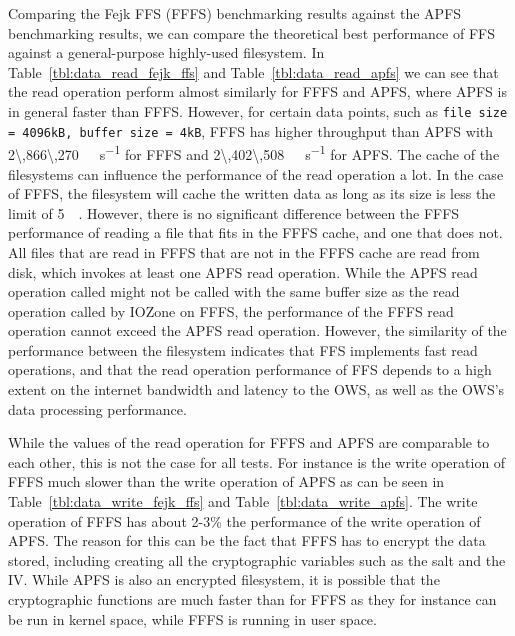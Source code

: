 Comparing the Fejk FFS (FFFS) benchmarking results against the APFS benchmarking results, we can compare the theoretical best performance of FFS against a general-purpose highly-used filesystem. In Table~\ref{tbl:data_read_fejk_ffs} and Table~\ref{tbl:data_read_apfs} we can see that the read operation perform almost similarly for FFFS and APFS, where APFS is in general faster than FFFS. However, for certain data points, such as \texttt{file size = 4096kB, buffer size = 4kB}, FFFS has higher throughput than APFS with \SI[per-mode = symbol]{2\,866\,270}{\kilo\byte\per\second} for FFFS and \SI[per-mode = symbol]{2\,402\,508}{\kilo\byte\per\second} for APFS. The cache of the filesystems can influence the performance of the read operation a lot. In the case of FFFS, the filesystem will cache the written data as long as its size is less the limit of \SI{5}{\mega\byte}. However, there is no significant difference between the FFFS performance of reading a file that fits in the FFFS cache, and one that does not. All files that are read in FFFS that are not in the FFFS cache are read from disk, which invokes at least one APFS read operation. While the APFS read operation called might not be called with the same buffer size as the read operation called by IOZone on FFFS, the performance of the FFFS read operation cannot exceed the APFS read operation. However, the similarity of the performance between the filesystem indicates that FFS implements fast read operations, and that the read operation performance of FFS depends to a high extent on the internet bandwidth and latency to the OWS, as well as the OWS's data processing performance.

While the values of the read operation for FFFS and APFS are comparable to each other, this is not the case for all tests. For instance is the write operation of FFFS much slower than the write operation of APFS as can be seen in Table~\ref{tbl:data_write_fejk_ffs} and Table~\ref{tbl:data_write_apfs}. The write operation of FFFS has about 2-3\% the performance of the write operation of APFS. The reason for this can be the fact that FFFS has to encrypt the data stored, including creating all the cryptographic variables such as the salt and the IV. While APFS is also an encrypted filesystem, it is possible that the cryptographic functions are much faster than for FFFS as they for instance can be run in kernel space, while FFFS is running in user space.

